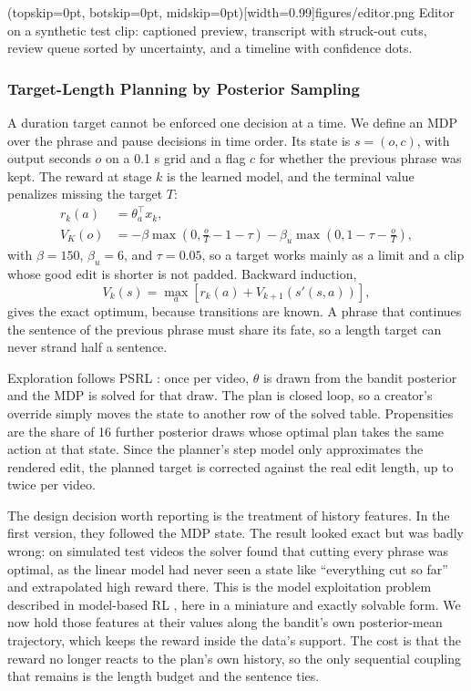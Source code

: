 \documentclass{ieeeaccess}
\begin{document}
\Figure[t!](topskip=0pt, botskip=0pt, midskip=0pt)[width=0.99\columnwidth]{figures/editor.png}
{Editor on a synthetic test clip: captioned preview, transcript with struck-out cuts, review queue sorted by uncertainty, and a timeline with confidence dots.\label{fig:editor}}

\subsubsection{Target-Length Planning by Posterior Sampling}
A duration target cannot be enforced one decision at a time. We define an MDP over the phrase and pause decisions in time order. Its state is $s=(o,c)$, with output seconds $o$ on a 0.1 s grid and a flag $c$ for whether the previous phrase was kept. The reward at stage $k$ is the learned model, and the terminal value penalizes missing the target $T$:
\begin{align}
r_k(a) &= \theta_a^{\top} x_k, \\
V_K(o) &= -\beta \max\!\left(0,\tfrac{o}{T}-1-\tau\right) - \beta_u \max\!\left(0,1-\tau-\tfrac{o}{T}\right),
\end{align}
with $\beta=150$, $\beta_u=6$, and $\tau=0.05$, so a target works mainly as a limit and a clip whose good edit is shorter is not padded. Backward induction,
\begin{equation}
V_k(s) = \max_a \left[ r_k(a) + V_{k+1}\left(s'(s,a)\right) \right], \label{eq:bellman}
\end{equation}
gives the exact optimum, because transitions are known. A phrase that continues the sentence of the previous phrase must share its fate, so a length target can never strand half a sentence.

Exploration follows PSRL \cite{osband2013}: once per video, $\theta$ is drawn from the bandit posterior and the MDP is solved for that draw. The plan is closed loop, so a creator's override simply moves the state to another row of the solved table. Propensities are the share of 16 further posterior draws whose optimal plan takes the same action at that state. Since the planner's step model only approximates the rendered edit, the planned target is corrected against the real edit length, up to twice per video.

The design decision worth reporting is the treatment of history features. In the first version, they followed the MDP state. The result looked exact but was badly wrong: on simulated test videos the solver found that cutting every phrase was optimal, as the linear model had never seen a state like ``everything cut so far'' and extrapolated high reward there. This is the model exploitation problem described in model-based RL \cite{janner2019,yu2020}, here in a miniature and exactly solvable form. We now hold those features at their values along the bandit's own posterior-mean trajectory, which keeps the reward inside the data's support. The cost is that the reward no longer reacts to the plan's own history, so the only sequential coupling that remains is the length budget and the sentence ties.
\end{document}
